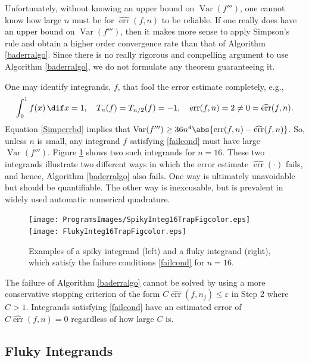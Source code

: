\documentclass[]{article}
\DeclareMathOperator{\Var}{Var}
\DeclareMathOperator{\err}{err}
\newcommand{\herr}{\widehat{\err}}
\theoremstyle{definition}
\theoremstyle{remark}
\begin{document}
Unfortunately, without knowing an upper bound on $\Var(f''')$, one cannot know how large $n$ must be for $\herr(f,n)$ to be reliable.  If one really does have an upper bound on $\Var(f''')$, then it makes more sense to apply Simpson's rule and obtain a higher order convergence rate than that of Algorithm \ref{baderralgo}.  Since there is no really rigorous and compelling argument to use Algorithm \ref{baderralgo}, we do not formulate any theorem guaranteeing it.

One may identify integrands, $f$, that fool the error estimate completely, e.g.,
\begin{equation} \label{failcond}
\int_0^1 f(x) \, \dif x =  1, \quad T_{n}(f)=T_{n/2}(f) = -1, \quad \err(f,n)=2 \ne 0 = \herr(f,n).
\end{equation}
Equation \eqref{Simperrbd} implies that $\Var(f''') \ge 36 n^4 \abs{\err(f,n) - \herr(f,n)}$.  So, unless $n$ is small, any integrand $f$ satisfying \eqref{failcond} must have large  $\Var(f''')$.  Figure \ref{spikeflukefig} shows two such integrands for $n=16$. These two integrands illustrate two different ways in which the error estimate $\herr(\cdot)$ fails, and hence, Algorithm \ref{baderralgo} also fails.  One way is ultimately unavoidable but should be quantifiable.  The other way is inexcusable, but is prevalent in widely used automatic numerical quadrature.

\begin{figure}
\centering 
\texttt{[image: ProgramsImages/SpikyInteg16TrapFigcolor.eps]} \qquad
\texttt{[image: FlukyInteg16TrapFigcolor.eps]}
\caption{Examples of a spiky integrand (left) and a fluky integrand (right), which satisfy the failure conditions \eqref{failcond} for $n=16$. \label{spikeflukefig}}
\end{figure}

The failure of Algorithm \ref{baderralgo} cannot be solved by using a more conservative stopping criterion of the form $C\herr(f,n_j) \le \varepsilon$ in Step 2 where $C>1$.  Integrands satisfying \eqref{failcond} have an estimated error of $C\herr(f,n)=0$ regardless of how large $C$ is.



\subsection{Fluky Integrands} \label{flukysubsec}
\end{document}
